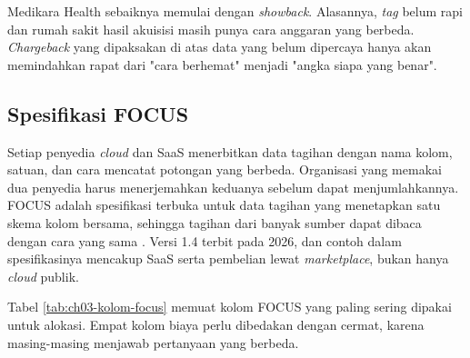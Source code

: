 Medikara Health sebaiknya memulai dengan \textit{showback}. Alasannya, \textit{tag} belum rapi dan
rumah sakit hasil akuisisi masih punya cara anggaran yang berbeda. \textit{Chargeback} yang
dipaksakan di atas data yang belum dipercaya hanya akan memindahkan rapat dari "cara berhemat"
menjadi "angka siapa yang benar".

\subsection{Spesifikasi FOCUS}

Setiap penyedia \textit{cloud} dan SaaS menerbitkan data tagihan dengan nama kolom, satuan, dan cara
mencatat potongan yang berbeda. Organisasi yang memakai dua penyedia harus menerjemahkan keduanya
sebelum dapat menjumlahkannya. FOCUS adalah spesifikasi terbuka untuk data tagihan yang menetapkan
satu skema kolom bersama, sehingga tagihan dari banyak sumber dapat dibaca dengan cara yang sama
\cite{c03-focus}. Versi 1.4 terbit pada 2026, dan contoh dalam spesifikasinya mencakup SaaS serta
pembelian lewat \textit{marketplace}, bukan hanya \textit{cloud} publik.

Tabel \ref{tab:ch03-kolom-focus} memuat kolom FOCUS yang paling sering dipakai untuk alokasi. Empat
kolom biaya perlu dibedakan dengan cermat, karena masing-masing menjawab pertanyaan yang berbeda.

